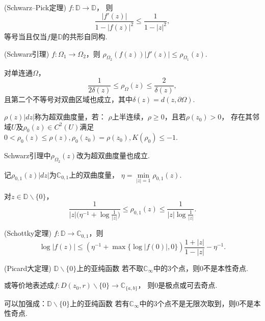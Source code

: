 \begin{proposition}(Schwarz--Pick定理) $f\colon\mathbb{D}\rightarrow\mathbb{D}$，
则$$\frac{|f'(z)|}{1-|f(z)|^2}\leq\frac{1}{1-|z|^2},$$
等号当且仅当$f$是$\mathbb{D}$的共形自同构.\end{proposition}

\begin{proposition}(Schwarz引理) $f\colon\Omega_1\rightarrow\Omega_2$，则
$\rho_{\Omega_2}(f(z))|f'(z)|\leq\rho_{\Omega_1}(z)$.\end{proposition}

\begin{proposition}对单连通$\Omega$，$$\frac{1}{2\delta(z)}\leq\rho_\Omega(z)\leq\frac{2}{\delta(z)},$$
且第二个不等号对双曲区域也成立，其中$\delta(z)=d(z,\partial\Omega)$.\end{proposition}

\begin{definition}$\rho(z)|dz|$称为超双曲度量，若：
$\rho$上半连续，$\rho\geq0$，且若$\rho(z_0)>0$，
存在其邻域$U$及$\rho_0(z)\in C^2(U)$满足
$0<\rho_0(z)\leq\rho(z),\rho_0(z_0)=\rho(z_0),K(\rho_0)\leq-1$.\end{definition}

\begin{proposition}Schwarz引理中$\rho_{\Omega_2}(z)$改为超双曲度量也成立.\end{proposition}

记$\rho_{0,1}(z)|dz|$为$\mathbb{C}_{0,1}$上的双曲度量，
$\eta=\min\limits_{|z|=1}\rho_{0,1}(z)$.

\begin{proposition}对$z\in\mathbb{D}\backslash\{0\}$，
$$\frac{1}{|z|\big(\eta^{-1}+\log\frac{1}{|z|}\big)}\leq\rho_{0,1}(z)\leq\frac{1}{|z|\log\frac{1}{|z|}}.$$\end{proposition}

\begin{proposition}(Schottky定理) $f\colon\mathbb{D}\rightarrow\mathbb{C}_{0,1}$，则
$$\log|f(z)|\leq(\eta^{-1}+\max\{\log|f(0)|,0\})\frac{1+|z|}{1-|z|}-\eta^{-1}.$$\end{proposition}

\begin{proposition}(Picard大定理) $\mathbb{D}\backslash\{0\}$上的亚纯函数
若不取$\mathbb{C}_\infty$中的$3$个点，则$0$不是本性奇点.
\end{proposition}
\begin{remark}或等价地表述成$f\colon D(z_0,r)\backslash\{0\}\rightarrow\mathbb{C}_{\{a,b\}}$，
则$0$是极点或可去奇点.

可以加强成：$\mathbb{D}\backslash\{0\}$上的亚纯函数
若有$\mathbb{C}_\infty$中的$3$个点不是无限次取到，则$0$不是本性奇点.\end{remark}

